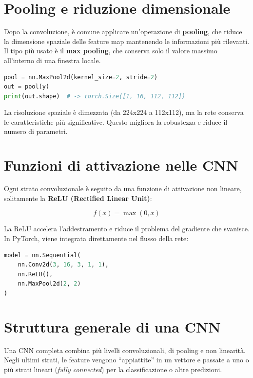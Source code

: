 \documentclass[11pt,a4paper]{report}
\begin{document}
\section{Pooling e riduzione dimensionale}

Dopo la convoluzione, è comune applicare un’operazione di \textbf{pooling}, che riduce la dimensione spaziale delle feature map mantenendo le informazioni più rilevanti.  
Il tipo più usato è il \textbf{max pooling}, che conserva solo il valore massimo all’interno di una finestra locale.

\begin{lstlisting}[language=Python, caption={Esempio di operazione di max pooling.}]
pool = nn.MaxPool2d(kernel_size=2, stride=2)
out = pool(y)
print(out.shape)  # -> torch.Size([1, 16, 112, 112])
\end{lstlisting}

\begin{tcolorbox}[title=Effetto del pooling]
La risoluzione spaziale è dimezzata (da 224x224 a 112x112), ma la rete conserva le caratteristiche più significative.  
Questo migliora la robustezza e riduce il numero di parametri.
\end{tcolorbox}

\section{Funzioni di attivazione nelle CNN}

Ogni strato convoluzionale è seguito da una funzione di attivazione non lineare, solitamente la \textbf{ReLU (Rectified Linear Unit)}:

\[
f(x) = \max(0, x)
\]

La ReLU accelera l’addestramento e riduce il problema del gradiente che svanisce.  
In PyTorch, viene integrata direttamente nel flusso della rete:

\begin{lstlisting}[language=Python, caption={Uso della funzione ReLU in una CNN.}]
model = nn.Sequential(
    nn.Conv2d(3, 16, 3, 1, 1),
    nn.ReLU(),
    nn.MaxPool2d(2, 2)
)
\end{lstlisting}

\section{Struttura generale di una CNN}

Una CNN completa combina più livelli convoluzionali, di pooling e non linearità.  
Negli ultimi strati, le feature vengono “appiattite” in un vettore e passate a uno o più strati lineari (\emph{fully connected}) per la classificazione o altre predizioni.
\end{document}
